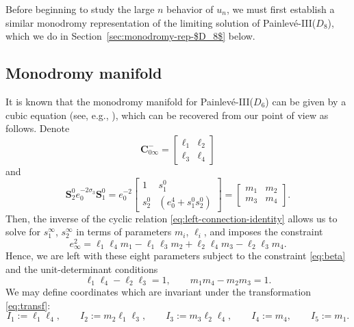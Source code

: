 \documentclass[11pt]{article}
\numberwithin{equation}{section}
\numberwithin{equation}{section}
\begin{document}
Before beginning to study the large $n$ behavior of $u_n$, we must first establish a similar monodromy representation of the limiting solution of Painlev\'e-III($D_8$), which we do in Section~\ref{sec:monodromy-rep-$D_8$} below.

\subsection{Monodromy manifold}
\label{subsec:monodromy-D6}
It is known that the monodromy manifold for Painlev\'e-III($D_6$) can be given by a cubic equation (see, e.g., \cite{PS}), which can be recovered from our point of view as follows. Denote
\begin{equation*}
 \mathbf{C}_{0\infty}^-=\begin{bmatrix}
 \ell_1&\ell_2\\\ell_3&\ell_4
 \end{bmatrix}
\end{equation*}
and
\begin{equation*}
 \mathbf{S}^0_{2}e_0^{-2\sigma_3}\mathbf{S}_{1}^0 =e_0^{-2} \begin{bmatrix}
 1& s^0_1\\ s^0_2& \left(e_0^4+s^0_1s^0_2 \right)
 \end{bmatrix}=\begin{bmatrix}
 m_1&m_2\\m_3&m_4
 \end{bmatrix}.
\end{equation*}
Then, the inverse of the cyclic relation \eqref{eq:left-connection-identity} allows us to solve for $s_1^\infty$, $s_2^\infty$ in terms of parameters $m_i$, $\ell_i$, and imposes the constraint
\begin{equation}\label{eq:beta}
 e_\infty^2=\ell_1\ell_4m_1-\ell_1\ell_3m_2+\ell_2\ell_4m_3-\ell_2\ell_3m_4.
\end{equation}
Hence, we are left with these eight parameters subject to the constraint \eqref{eq:beta} and the unit-determinant conditions
\begin{equation}\label{eq:det}
 \ell_1\ell_4-\ell_2\ell_3=1,\qquad m_1m_4-m_2m_3=1.
\end{equation}
We may define coordinates which are invariant under the transformation \eqref{eq:transf}:
\begin{equation*}
 I_1:= \ell_1\ell_4,\qquad I_2 := m_2\ell_1\ell_3,\qquad I_3 :=m_3\ell_2\ell_4,\qquad I_4:= m_4, \qquad I_5:= m_1.
 \end{equation*}
\end{document}
